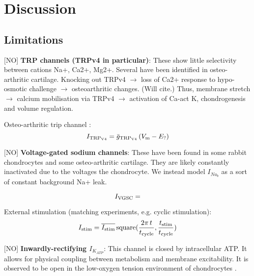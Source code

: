 \section*{Discussion}
\label{sec:discussion}



\subsection*{Limitations}
\label{sec:limitations}

[NO] {\bf TRP channels (TRPv4 in particular)}: These show little
selectivity between cations Na+, Ca2+, Mg2+. Several have been
identified in osteo-arthritic cartilage. Knocking out TRPv4
$\rightarrow$ loss of Ca2+ response to hypo-osmotic challenge
$\rightarrow$ osteoarthritic changes. (Will cite.) Thus, membrane
stretch $\rightarrow$ calcium mobilisation via TRPv4 $\rightarrow$
activation of Ca-act K, chondrogenesis and volume regulation.

Osteo-arthritic trip channel \citep{UNKNOWN}:
\begin{equation}
  I_{\rm TRP_{V4}} = \bar{g}_{\rm TRP_{V4}}\, (V_{\rm m} - E_{\rm ?})
\end{equation}

[NO] {\bf Voltage-gated sodium channels}: These have been found in
some rabbit chondrocytes and some osteo-arthritic cartilage. They are
likely constantly inactivated due to the voltages the
chondrocyte.  We instead model $I_{Na_{b}}$ as a sort of constant
background Na+ leak.


\begin{equation}
  I_{\rm VGSC} =
\end{equation}

External stimulation (matching experiments, e.g. cyclic stimulation):
\begin{equation}
I_{\rm stim} = \overline{I_{\rm stim}}\, {\rm square}(\frac{2 \pi\,
  t}{t_{\rm cycle}}, \frac{t_{\rm stim}}{t_{\rm cycle}})
\end{equation}


[NO] {\bf Inwardly-rectifying $I_{K_{ATP}}$}: This channel is closed by
intracellular ATP. It allows for physical coupling between metabolism
and membrane excitability. It is observed to be open in the low-oxygen
tension environment of chondrocytes \citep{DartStanden1994,
  Mobasherietal2007}.

